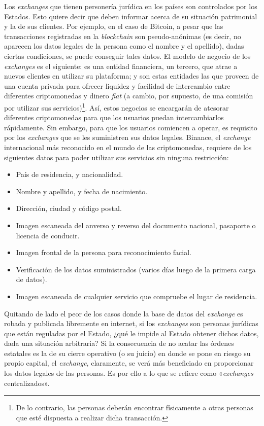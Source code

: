 \documentclass[12pt,a4paper]{article}
\begin{document}
Los \textit{exchanges} que tienen personería jurídica en los países son controlados por los Estados. Esto quiere decir que deben informar acerca de su situación patrimonial y la de sus clientes. Por ejemplo, en el caso de Bitcoin, a pesar que las transacciones registradas en la \textit{blockchain} son pseudo-anónimas (es decir, no aparecen los datos legales de la persona como el nombre y el apellido), dadas ciertas condiciones, se puede conseguir tales datos. El modelo de negocio de los \textit{exchanges} es el siguiente: es una entidad financiera, un tercero, que atrae a nuevos clientes en utilizar su plataforma; y son estas entidades las que proveen de una cuenta privada para ofrecer liquidez y facilidad de intercambio entre diferentes criptomonedas y dinero \textit{fiat} (a cambio, por supuesto, de una comisión por utilizar sus servicios)\footnote{De lo contrario, las personas deberán encontrar físicamente a otras personas que esté dispuesta a realizar dicha transacción.}. Así, estos negocios se encargarán de atesorar diferentes criptomonedas para que los usuarios puedan intercambiarlos rápidamente. Sin embargo, para que los usuarios comiencen a operar, es requisito por los \textit{exchanges} que se les suministren sus datos legales. Binance, el \textit{exchange} internacional más reconocido en el mundo de las criptomonedas, requiere de los siguientes datos para poder utilizar sus servicios sin ninguna restricción:

\begin{itemize}
\item País de residencia, y nacionalidad.
\item Nombre y apellido, y fecha de nacimiento.
\item Dirección, ciudad y código postal.
\item Imagen escaneada del anverso y reverso del documento nacional, pasaporte o licencia de conducir.
\item Imagen frontal de la persona para reconocimiento facial.
\item Verificación de los datos suministrados (varios días luego de la primera carga de datos).
\item Imagen escaneada de cualquier servicio que compruebe el lugar de residencia.
\end{itemize}

Quitando de lado el peor de los casos donde la base de datos del \textit{exchange} es robada y publicada libremente en internet, si los \textit{exchanges} son personas jurídicas que están reguladas por el Estado, ¿qué le impide al Estado obtener dichos datos, dada una situación arbitraria? Si la consecuencia de no acatar las órdenes estatales es la de su cierre operativo (o su juicio) en donde se pone en riesgo su propio capital, el \textit{exchange}, claramente, se verá más beneficiado en proporcionar los datos legales de las personas. Es por ello a lo que se refiere como «\textit{exchanges} centralizados».
\end{document}
